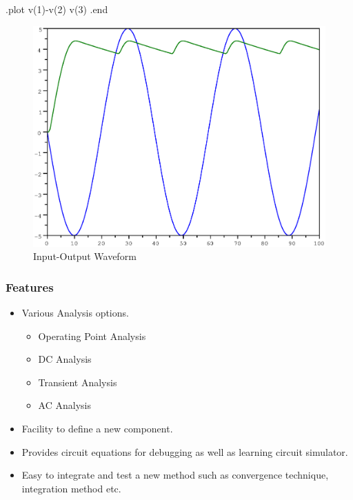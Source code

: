 \documentclass{beamer}
\begin{document}
\begin{frame}
\begin{minipage}[!b]{0.47\linewidth}
\begin{tiny}
.plot v(1)-v(2) v(3) 
\newline
\vspace{-0.1cm}
.end 
\end{tiny}
\end{minipage}
\hspace{0.1cm} %
\begin{minipage}[!b]{0.47\linewidth} %
\begin{figure}[h]
\centering
\includegraphics[scale=0.3]{../figures/bridgeFilterOutput.eps}
\caption{Input-Output Waveform} 
\end{figure}
\end{minipage}
\end{frame}

\begin{frame}
 \frametitle{Features}
\begin{itemize}
  \item Various Analysis options.
    \begin{itemize}
      \item Operating Point Analysis
      \item DC Analysis 
      \item Transient Analysis  
      \item AC Analysis 
    \end{itemize}
  \item {\color{red} Facility to define a new component.}
  \item Provides circuit equations for debugging as well as learning circuit simulator.
  \item Easy to integrate and test a new method such as convergence technique, integration method etc. 
\end{itemize} 
\end{frame}
\end{document}
